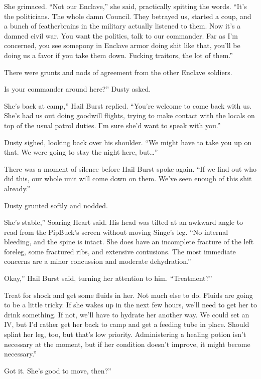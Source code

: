 She grimaced. “Not our Enclave,” she said, practically spitting the words. “It’s the politicians. The whole damn Council. They betrayed us, started a coup, and a bunch of featherbrains in the military actually listened to them. Now it’s a damned civil war. You want the politics, talk to our commander. Far as I’m concerned, you see somepony in Enclave armor doing shit like that, you’ll be doing us a favor if you take them down. Fucking traitors, the lot of them.”

There were grunts and nods of agreement from the other Enclave soldiers.

\leavevmode{}Is your commander around here?” Dusty asked.

\leavevmode{}She’s back at camp,” Hail Burst replied. “You’re welcome to come back with us. She’s had us out doing goodwill flights, trying to make contact with the locals on top of the usual patrol duties. I’m sure she’d want to speak with you.”

Dusty sighed, looking back over his shoulder. “We might have to take you up on that. We were going to stay the night here, but…”

There was a moment of silence before Hail Burst spoke again. “If we find out who did this, our whole unit will come down on them. We’ve seen enough of this shit already.”

Dusty grunted softly and nodded.

\leavevmode{}She’s stable,” Soaring Heart said. His head was tilted at an awkward angle to read from the PipBuck’s screen without moving Singe’s leg. “No internal bleeding, and the spine is intact. She does have an incomplete fracture of the left foreleg, some fractured ribs, and extensive contusions. The most immediate concerns are a minor concussion and moderate dehydration.”

\leavevmode{}Okay,” Hail Burst said, turning her attention to him. “Treatment?”

\leavevmode{}Treat for shock and get some fluids in her. Not much else to do. Fluids are going to be a little tricky. If she wakes up in the next few hours, we’ll need to get her to drink something. If not, we’ll have to hydrate her another way. We could set an IV, but I’d rather get her back to camp and get a feeding tube in place. Should splint her leg, too, but that’s low priority. Administering a healing potion isn’t necessary at the moment, but if her condition doesn’t improve, it might become necessary.”

\leavevmode{}Got it. She’s good to move, then?”

